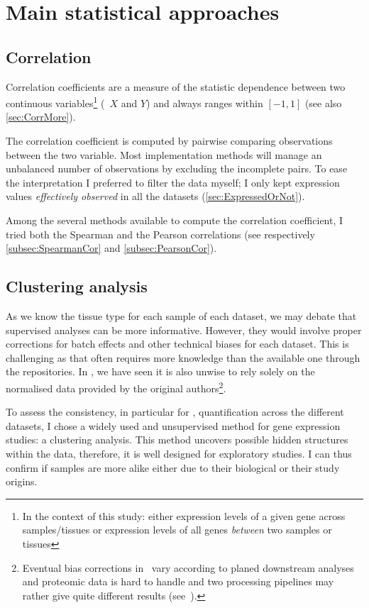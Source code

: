 \section{Main statistical approaches}

\subsection{Correlation}

Correlation coefficients are a measure of the statistic dependence between two
continuous variables\footnote{In the context of this study: either expression
levels of a given gene across samples/tissues or expression levels of all genes
\emph{between} two samples or tissues} (\eg\
$X$ and $Y$) and always ranges within $[-1,1]$ (see also \cref{sec:CorrMore}).

The correlation coefficient is computed by pairwise comparing observations
between the two variable. Most implementation methods
will manage an unbalanced number of observations by excluding the incomplete pairs.
To ease the interpretation I preferred to filter the data \latin{a priori}
myself; I only kept expression values \emph{effectively observed}
in all the datasets (\cref{sec:ExpressedOrNot}).

Among the several methods available to compute the correlation coefficient, I
tried both the Spearman and the Pearson correlations
(see respectively \cref{subsec:SpearmanCor} and \cref{subsec:PearsonCor}).

\subsection{Clustering analysis}

As we know the tissue type for each sample of each dataset,
we may debate that supervised analyses can be more informative.
However, they would involve proper corrections for batch effects and
other technical biases for each dataset.
This is challenging as that often requires more knowledge than the available one
through the repositories.
In , we have seen it is also unwise to rely solely on the
normalised data provided by the original authors\footnote{Eventual bias corrections
in \Rnaseq\ vary according to planed downstream analyses and
proteomic data is hard to handle and two processing pipelines may rather give
quite different results (see~\Cref{ch:proteomics}).}.

To assess the consistency, in particular for \Rnaseq, quantification across
the different datasets, I chose a widely used and unsupervised method for gene
expression studies: a clustering analysis.
This method uncovers possible hidden
structures within the data, therefore,
it is well designed for exploratory studies.
I can thus confirm if samples are more alike either due to their
biological or their study origins.

